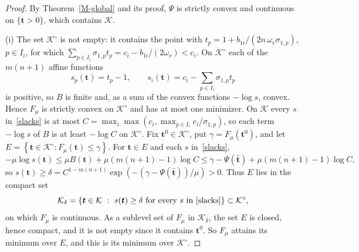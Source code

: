 \documentclass[11pt]{article}
\theoremstyle{plain}
\theoremstyle{remark}
\numberwithin{equation}{section}
\begin{document}
\begin{proof}
By Theorem~\ref{M-global} and its proof, $\Psi$ is strictly convex and
continuous on $\{\bm t>0\}$, which contains $\mathcal{K}$.

(i) The set $\mathcal{K}^\circ$ is not empty: it contains the point with
$t_p=1+b_{1i}/\left(2n\,\omega_v\sigma_{1,p}\right)$, $p\in I_i$, for which
$\sum_{p\in I_i}\sigma_{1,p}t_p=c_i-b_{1i}/(2\omega_v)<c_i$.
On $\mathcal{K}^\circ$ each of the $m(n+1)$ affine functions
\begin{equation}\label{slacks}
s_{p}(\bm t)=t_p-1,\qquad
s_{i}(\bm t)=c_i-\sum_{p\in I_i}\sigma_{1,p}t_p
\end{equation}
is positive, so $B$ is finite and, as a sum of the convex functions $-\log s$,
convex. Hence $F_\mu$ is strictly convex on $\mathcal{K}^\circ$ and has at most one
minimizer. On $\mathcal{K}$ every $s$ in~\eqref{slacks} is at most
$C=\max_{i}\max\left(c_i,\max_{p\in I_i}c_i/\sigma_{1,p}\right)$, so each term
$-\log s$ of $B$ is at least $-\log C$ on $\mathcal{K}^\circ$. Fix $\bm t^0\in \mathcal{K}^\circ$,
put $\gamma=F_\mu(\bm t^0)$, and let
$E=\left\{\bm t\in \mathcal{K}^\circ: F_\mu(\bm t)\le \gamma\right\}$.
For $\bm t\in E$ and each $s$ in~\eqref{slacks},
\begin{equation}
-\mu\log s(\bm t)\le\mu B(\bm t)+\mu\left(m(n+1)-1\right)\log C
\le \gamma-\Psi(\widehat{\bm t})+\mu\left(m(n+1)-1\right)\log C,
\end{equation}
so $s(\bm t)\ge\delta=C^{1-m(n+1)}\exp\left(-\left(\gamma-\Psi(\widehat{\bm t})\right)/\mu\right)>0$.
Thus $E$ lies in the compact set
\begin{equation}
\mathcal{K}_\delta=\left\{\bm t\in\mathcal{K}\ :\ s(\bm t)\ge\delta\
\mbox{for every $s$ in~\eqref{slacks}}\right\}\subset \mathcal{K}^\circ,
\end{equation}
on which $F_\mu$ is continuous. As a sublevel set of $F_\mu$ in $\mathcal{K}_\delta$, the
set $E$ is closed, hence compact, and it is not empty since it contains
$\bm t^0$. So $F_\mu$ attains its minimum over $E$, and this is its
minimum over $\mathcal{K}^\circ$.


\end{proof}
\end{document}
